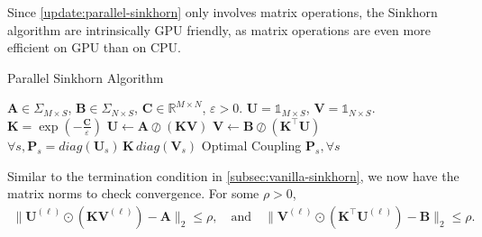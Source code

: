 \begin{remark}[]
  Since \cref{update:parallel-sinkhorn} only involves matrix operations,
  the Sinkhorn algorithm are intrinsically GPU friendly, as matrix operations are even more efficient on GPU than on CPU.
\end{remark}


\begin{algorithm}[H]
  \caption{Parallel Sinkhorn Algorithm}
  \begin{algorithmic}[1]\label{algo:parallel-sinkhorn}
    \Require $\mathbf{A} \in \Sigma_{M\times S}$, $\mathbf{B}\in \Sigma_{N\times S}$, $\mathbf{C} \in \mathbb{R}^{M\times N}$, $\varepsilon > 0$.
    \Initialize $\mathbf{U} = \mathbb{1}_{M \times S}$, $\mathbf{V} = \mathbb{1}_{N \times S}$.
    \State $\mathbf{K} = \exp(-\frac{\mathbf{C}}{\varepsilon})$
    \State $\mathbf{U} \leftarrow \mathbf{A} \oslash (\mathbf{K} \mathbf{V})$
    \State $\mathbf{V} \leftarrow \mathbf{B} \oslash (\mathbf{K}^\top \mathbf{U})$
    \EndWhile
    \State $\forall s, \mathbf{P}_s = diag(\mathbf{U}_s) \, \mathbf{K} \, diag(\mathbf{V}_s)$
    \Ensure Optimal Coupling $\mathbf{P}_s, \forall s$
  \end{algorithmic}
\end{algorithm}

\begin{remark}
  Similar to the termination condition in \cref{subsec:vanilla-sinkhorn}, we now have the matrix norms to check convergence.
  For some $\rho > 0$,
  \begin{equation*}
    \begin{aligned}
      \lVert
      \mathbf{U}^{(\ell)} \odot \left(\mathbf{K} \mathbf{V}^{(\ell)}\right) - \mathbf{A}
      \rVert_2 \le \rho,
      \quad\text{and}\quad
      \lVert
      \mathbf{V}^{(\ell)} \odot \left(\mathbf{K}^\top \mathbf{U}^{(\ell)}\right) - \mathbf{B}
      \rVert_2 \le \rho.
    \end{aligned}
  \end{equation*}
\end{remark}























